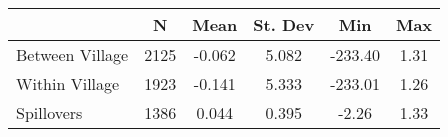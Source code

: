 \begin{tabular}{l*{5}{c}}\hline&\multicolumn{1}{c}{N}&\multicolumn{1}{c}{Mean}&\multicolumn{1}{c}{St. Dev}&\multicolumn{1}{c}{Min}&\multicolumn{1}{c}{Max}\\ \hline 
Between Village & 2125 & -0.062 & 5.082 & -233.40 & 1.31 \\
Within Village & 1923 & -0.141 & 5.333 & -233.01 & 1.26 \\
Spillovers & 1386 & 0.044 & 0.395 & -2.26 & 1.33 \\
\hline \end{tabular}
